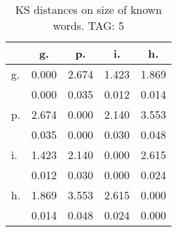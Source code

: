 \begin{table}[h!]
\begin{center}
\begin{tabular}{| l | c | c | c | c |}\hline
 & g. & p. & i. & h. \\\hline
g. & 0.000  & 2.674  & 1.423  & 1.869 \\\hline
 & 0.000  & 0.035  & 0.012  & 0.014 \\\hline
p. & 2.674  & 0.000  & 2.140  & 3.553 \\\hline
 & 0.035  & 0.000  & 0.030  & 0.048 \\\hline
i. & 1.423  & 2.140  & 0.000  & 2.615 \\\hline
 & 0.012  & 0.030  & 0.000  & 0.024 \\\hline
h. & 1.869  & 3.553  & 2.615  & 0.000 \\\hline
 & 0.014  & 0.048  & 0.024  & 0.000 \\\hline
\end{tabular}
\caption{KS distances on size of known words. TAG: 5}
\end{center}
\end{table}